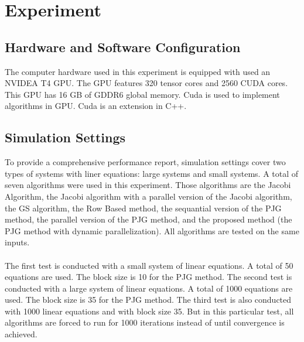\documentclass[11pt]{article}       %
\begin{document}
\section{Experiment} \label{expermient}

\subsection{Hardware and Software Configuration} \label{result}

The computer hardware used in this experiment is equipped with used an NVIDEA T4 GPU. The GPU features 320 tensor cores and 2560 CUDA cores. This GPU has 16 GB of GDDR6 global memory. Cuda is used to implement algorithms in GPU. Cuda is an extension in C++.

\subsection{Simulation Settings} \label{simulation_settings}

To provide a comprehensive performance report, simulation settings cover two types of systems with liner equations: large systems and small systems. A total of seven algorithms were used in this experiment. Those algorithms are the Jacobi Algorithm, the Jacobi algorithm with a parallel version of the Jacobi algorithm, the GS algorithm, the Row Based method, the sequantial version of the PJG method, the parallel version of the PJG method, and the proposed method (the PJG method with dynamic parallelization). All algorithms are tested on the same inputs.
\\
\\
The first test is conducted with a small system of linear equations. A total of 50 equations are used. The block size is 10 for the PJG method. The second test is conducted with a large system of linear equations. A total of 1000 equations are used. The block size is 35 for the PJG method. The third test is also conducted with 1000 linear equations and with block size 35. But in this particular test, all algorithms are forced to run for 1000 iterations instead of until convergence is achieved.
\end{document}
